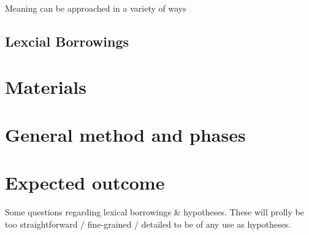 \documentclass[a4paper]{article}
\begin{document}
Meaning can be approached in a variety of ways \cite{Koptjevskaja-Tamm2008}

\cite{Sijs2005}


\subsection{Lexcial Borrowings}

\cite{Matras2009}

\section{Materials} 





\section{General method and phases}




\section{Expected outcome}



Some questions regarding lexical borrowings & hypotheses. These will prolly be too straightforward / fine-grained / detailed to be of any use as hypotheses.
\end{document}
